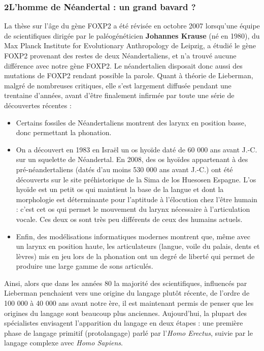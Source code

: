 \subsubsection*{2\quad L’homme de Néandertal : un grand bavard ?}
La thèse sur l’âge du gène FOXP2 a été révisée en octobre 2007 lorsqu’une équipe de scientifiques dirigée par le paléogénéticien \textbf{Johannes Krause} (né en 1980), du Max Planck Institute for Evolutionary Anthropology de Leipzig, a étudié le gène FOXP2 provenant des restes de deux Néandertaliens, et n’a trouvé aucune différence avec notre gène FOXP2. Le néandertalien disposait donc aussi des mutations de FOXP2 rendant possible la parole. Quant à théorie de Lieberman, malgré de nombreuses critiques, elle s’est largement diffusée pendant une trentaine d’années, avant d’être finalement infirmée par toute une série de découvertes récentes :
\begin{itemize}
\item Certains fossiles de Néandertaliens montrent des larynx en position basse, donc permettant la phonation.
\item On a découvert en 1983 en Israël un os hyoïde daté de 60 000 ans avant J.-C. sur un squelette de Néandertal. En 2008, des os hyoïdes appartenant à des pré-néandertaliens (datés d’au moins 530 000 ans avant J.-C.) ont été découverts sur le site préhistorique de la Sima de los Huesosen Espagne. L’os hyoïde est un petit os qui maintient la base de la langue et dont la morphologie est déterminante pour l’aptitude à l’élocution chez l’être humain : c’est cet os qui permet le mouvement du larynx nécessaire à l’articulation vocale. Ces deux os sont très peu différents de ceux des humains actuels.
\item Enfin, des modélisations informatiques modernes montrent que, même avec un larynx en position haute, les articulateurs (langue, voile du palais, dents et lèvres) mis en jeu lors de la phonation ont un degré de liberté qui permet de produire une large gamme de sons articulés.
\end{itemize}
Ainsi, alors que dans les années 80 la majorité des scientifiques, influencés par Lieberman penchaient vers une origine du langage plutôt récente, de l’ordre de 100 000 à 40 000 ans avant notre ère, il est maintenant permis de penser que les origines du langage sont beaucoup plus anciennes. Aujourd’hui, la plupart des spécialistes envisagent l’apparition du langage en deux étapes : une première phase de langage primitif (protolangage) parlé par l’\textit{Homo Erectus}, suivie par le langage complexe avec \textit{Homo Sapiens}.

